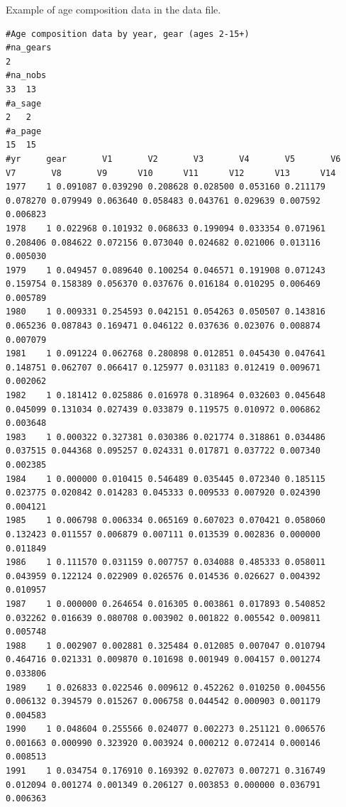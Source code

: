 \begin{landscape}
\begin{table}
\caption{Example of age composition data in the data file.}\label{T1}
\begin{scriptsize}
\begin{verbatim}
#Age composition data by year, gear (ages 2-15+)
#na_gears
2
#na_nobs
33	13
#a_sage
2	2
#a_page
15	15
#yr 	gear       V1       V2       V3       V4       V5       V6       V7       V8       V9      V10      V11      V12      V13      V14
1977    1 0.091087 0.039290 0.208628 0.028500 0.053160 0.211179 0.078270 0.079949 0.063640 0.058483 0.043761 0.029639 0.007592 0.006823
1978    1 0.022968 0.101932 0.068633 0.199094 0.033354 0.071961 0.208406 0.084622 0.072156 0.073040 0.024682 0.021006 0.013116 0.005030
1979    1 0.049457 0.089640 0.100254 0.046571 0.191908 0.071243 0.159754 0.158389 0.056370 0.037676 0.016184 0.010295 0.006469 0.005789
1980    1 0.009331 0.254593 0.042151 0.054263 0.050507 0.143816 0.065236 0.087843 0.169471 0.046122 0.037636 0.023076 0.008874 0.007079
1981    1 0.091224 0.062768 0.280898 0.012851 0.045430 0.047641 0.148751 0.062707 0.066417 0.125977 0.031183 0.012419 0.009671 0.002062
1982    1 0.181412 0.025886 0.016978 0.318964 0.032603 0.045648 0.045099 0.131034 0.027439 0.033879 0.119575 0.010972 0.006862 0.003648
1983    1 0.000322 0.327381 0.030386 0.021774 0.318861 0.034486 0.037515 0.044368 0.095257 0.024331 0.017871 0.037722 0.007340 0.002385
1984    1 0.000000 0.010415 0.546489 0.035445 0.072340 0.185115 0.023775 0.020842 0.014283 0.045333 0.009533 0.007920 0.024390 0.004121
1985    1 0.006798 0.006334 0.065169 0.607023 0.070421 0.058060 0.132423 0.011557 0.006879 0.007111 0.013539 0.002836 0.000000 0.011849
1986    1 0.111570 0.031159 0.007757 0.034088 0.485333 0.058011 0.043959 0.122124 0.022909 0.026576 0.014536 0.026627 0.004392 0.010957
1987    1 0.000000 0.264654 0.016305 0.003861 0.017893 0.540852 0.032262 0.016639 0.080708 0.003902 0.001822 0.005542 0.009811 0.005748
1988    1 0.002907 0.002881 0.325484 0.012085 0.007047 0.010794 0.464716 0.021331 0.009870 0.101698 0.001949 0.004157 0.001274 0.033806
1989    1 0.026833 0.022546 0.009612 0.452262 0.010250 0.004556 0.006132 0.394579 0.015267 0.006758 0.044542 0.000903 0.001179 0.004583
1990    1 0.048604 0.255566 0.024077 0.002273 0.251121 0.006576 0.001663 0.000990 0.323920 0.003924 0.000212 0.072414 0.000146 0.008513
1991    1 0.034754 0.176910 0.169392 0.027073 0.007271 0.316749 0.012094 0.001274 0.001349 0.206127 0.003853 0.000000 0.036791 0.006363

\end{verbatim}
\end{scriptsize}
\end{table}
\end{landscape}
